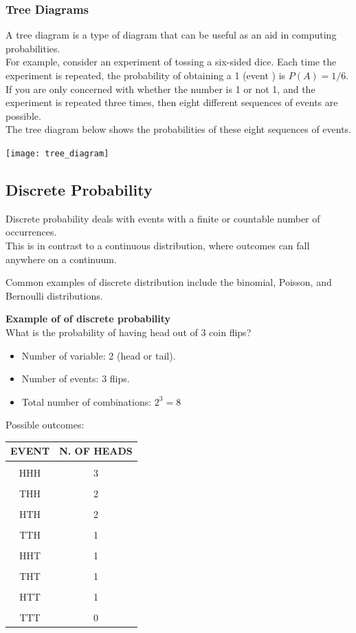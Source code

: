 \documentclass{article}
\begin{document}
\subsubsection{Tree Diagrams}
A tree diagram is a type of diagram that can be useful as an aid in computing probabilities. \\ 
For example, consider an experiment of tossing a six-sided dice. Each
time the experiment is repeated, the probability of obtaining a 1 (event ) is $P(A) = 1 / 6$. 
If you are only concerned with whether the number is 1 or not 1, and the experiment is repeated three times, then eight different sequences of events are possible. \\ 
The tree diagram below shows the probabilities of these eight sequences of events.

\texttt{[image: tree\_diagram]}

\subsection{Discrete Probability}
Discrete probability deals with events with a finite or countable number of occurrences. \\ 
This is in contrast to a continuous distribution, where outcomes can fall anywhere on a continuum. 

Common examples of discrete distribution include the binomial, Poisson, and Bernoulli distributions.

\textbf{Example of of discrete probability} \\
What is the probability of having head out of 3 coin flips?
\begin{itemize}
    \item Number of variable: 2 (head or tail).
    \item Number of events: 3 flips.
    \item Total number of combinations: $2^3 = 8$
\end{itemize}

Possible outcomes: \\ 
\begin{center}
\begin{tabular}{|c|c|}
\hline
EVENT & N. OF HEADS \\ \hline
&\\[-1em]
HHH & 3 \\ \hline
&\\[-1em]
THH & 2 \\ \hline
&\\[-1em]
HTH & 2 \\ \hline
&\\[-1em]
TTH & 1 \\ \hline
&\\[-1em]
HHT & 1 \\ \hline
&\\[-1em]
THT & 1 \\ \hline
&\\[-1em]
HTT & 1 \\ \hline
&\\[-1em]
TTT & 0 \\
\hline
\end{tabular}
\end{center}
\end{document}
